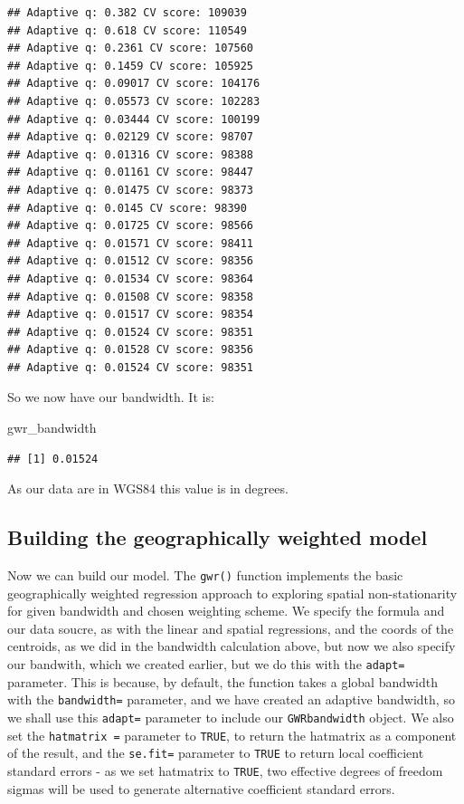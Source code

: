 \documentclass[
  krantz2]{krantz}
\makeatletter
\newenvironment{Shaded}{\begin{snugshade}}{\end{snugshade}}
\newcommand{\NormalTok}[1]{#1}
\newenvironment{kframe}{%
\medskip{}
\setlength{\fboxsep}{.8em}
 \def\at@end@of@kframe{}%
 \ifinner\ifhmode%
  \def\at@end@of@kframe{\end{minipage}}%
  \begin{minipage}{\columnwidth}%
 \fi\fi%
 \def\FrameCommand##1{\hskip\@totalleftmargin \hskip-\fboxsep
 \colorbox{shadecolor}{##1}\hskip-\fboxsep
     \hskip-\linewidth \hskip-\@totalleftmargin \hskip\columnwidth}%
 \MakeFramed {\advance\hsize-\width
   \@totalleftmargin\z@ \linewidth\hsize
   \@setminipage}}%
 {\par\unskip\endMakeFramed%
 \at@end@of@kframe}
\renewenvironment{Shaded}{\begin{kframe}}{\end{kframe}}
\makeatother
\begin{document}
\begin{verbatim}
## Adaptive q: 0.382 CV score: 109039 
## Adaptive q: 0.618 CV score: 110549 
## Adaptive q: 0.2361 CV score: 107560 
## Adaptive q: 0.1459 CV score: 105925 
## Adaptive q: 0.09017 CV score: 104176 
## Adaptive q: 0.05573 CV score: 102283 
## Adaptive q: 0.03444 CV score: 100199 
## Adaptive q: 0.02129 CV score: 98707 
## Adaptive q: 0.01316 CV score: 98388 
## Adaptive q: 0.01161 CV score: 98447 
## Adaptive q: 0.01475 CV score: 98373 
## Adaptive q: 0.0145 CV score: 98390 
## Adaptive q: 0.01725 CV score: 98566 
## Adaptive q: 0.01571 CV score: 98411 
## Adaptive q: 0.01512 CV score: 98356 
## Adaptive q: 0.01534 CV score: 98364 
## Adaptive q: 0.01508 CV score: 98358 
## Adaptive q: 0.01517 CV score: 98354 
## Adaptive q: 0.01524 CV score: 98351 
## Adaptive q: 0.01528 CV score: 98356 
## Adaptive q: 0.01524 CV score: 98351
\end{verbatim}

So we now have our bandwidth. It is:

\begin{Shaded}
\begin{Highlighting}[]
\NormalTok{gwr\_bandwidth}
\end{Highlighting}
\end{Shaded}

\begin{verbatim}
## [1] 0.01524
\end{verbatim}

As our data are in WGS84 this value is in degrees.

\hypertarget{building-the-geographically-weighted-model}{%
\subsection{Building the geographically weighted model}\label{building-the-geographically-weighted-model}}

Now we can build our model. The \texttt{gwr()} function implements the basic geographically weighted regression approach to exploring spatial non-stationarity for given bandwidth and chosen weighting scheme. We specify the formula and our data soucre, as with the linear and spatial regressions, and the coords of the centroids, as we did in the bandwidth calculation above, but now we also specify our bandwith, which we created earlier, but we do this with the \texttt{adapt=} parameter. This is because, by default, the function takes a global bandwidth with the \texttt{bandwidth=} parameter, and we have created an adaptive bandwidth, so we shall use this \texttt{adapt=} parameter to include our \texttt{GWRbandwidth} object. We also set the \texttt{hatmatrix\ =} parameter to \texttt{TRUE}, to return the hatmatrix as a component of the result, and the \texttt{se.fit=} parameter to \texttt{TRUE} to return local coefficient standard errors - as we set hatmatrix to \texttt{TRUE}, two effective degrees of freedom sigmas will be used to generate alternative coefficient standard errors.
\end{document}
